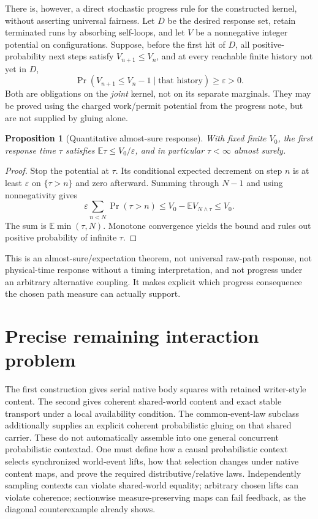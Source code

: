 \documentclass[11pt]{article}
\newtheorem{proposition}[theorem]{Proposition}
\begin{document}
There is, however, a direct stochastic progress rule for the constructed kernel, without asserting universal fairness. Let $D$ be the desired response set, retain terminated runs by absorbing self-loops, and let $V$ be a nonnegative integer potential on configurations. Suppose, before the first hit of $D$, all positive-probability next steps satisfy $V_{n+1}\le V_n$, and at every reachable finite history not yet in $D$,
\[
 \Pr(V_{n+1}\le V_n-1\mid\text{that history})\ge\varepsilon>0.
\]
Both are obligations on the \emph{joint} kernel, not on its separate marginals. They may be proved using the charged work/permit potential from the progress note, but are not supplied by gluing alone.

\begin{proposition}[Quantitative almost-sure response]
With fixed finite $V_0$, the first response time $\tau$ satisfies $\mathbb E\tau\le V_0/\varepsilon$, and in particular $\tau<\infty$ almost surely.
\end{proposition}
\begin{proof}
Stop the potential at $\tau$. Its conditional expected decrement on step $n$ is at least $\varepsilon$ on $\{\tau>n\}$ and zero afterward. Summing through $N-1$ and using nonnegativity gives
\[
 \varepsilon\sum_{n<N}\Pr(\tau>n)\le V_0-\mathbb E V_{N\wedge\tau}\le V_0.
\]
The sum is $\mathbb E\min(\tau,N)$. Monotone convergence yields the bound and rules out positive probability of infinite $\tau$.
\end{proof}
This is an almost-sure/expectation theorem, not universal raw-path response, not physical-time response without a timing interpretation, and not progress under an arbitrary alternative coupling. It makes explicit which progress consequence the chosen path measure can actually support.

\section{Precise remaining interaction problem}
The first construction gives serial native body squares with retained writer-style content. The second gives coherent shared-world content and exact stable transport under a local availability condition. The common-event-law subclass additionally supplies an explicit coherent probabilistic gluing on that shared carrier. These do not automatically assemble into one general concurrent probabilistic contextad. One must define how a causal probabilistic context selects synchronized world-event lifts, how that selection changes under native content maps, and prove the required distributive/relative laws. Independently sampling contexts can violate shared-world equality; arbitrary chosen lifts can violate coherence; sectionwise measure-preserving maps can fail feedback, as the diagonal counterexample already shows.
\end{document}
